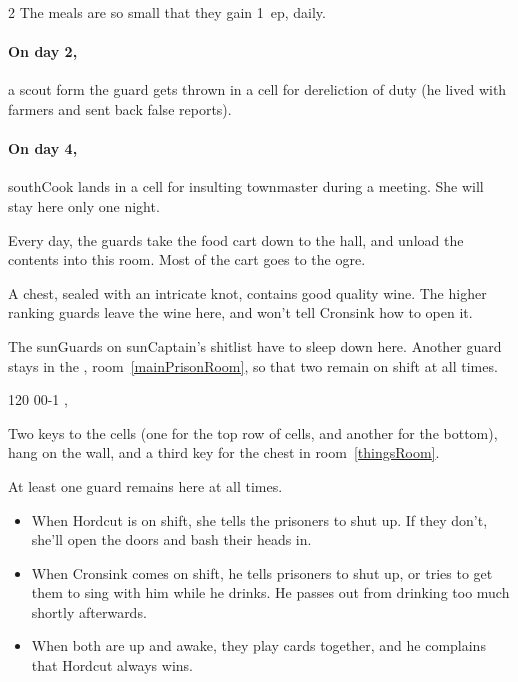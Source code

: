 \begin{multicols}{2}
The meals are so small that they gain 1~\gls{ep}, daily.

\paragraph{On day 2,}
a scout form the \gls{guard} gets thrown in a cell for dereliction of duty (he lived with farmers and sent back false reports).

\paragraph{On day 4,}
\gls{southCook} lands in a cell for insulting \gls{townmaster} during a meeting.
She will stay here only one night.


Every day, the guards take the food cart down to the hall, and unload the contents into this room.
Most of the cart goes to the \gls{ogre}.%

A chest, sealed with an intricate knot, contains good quality wine.
The higher ranking guards leave the wine here, and won't tell Cronsink how to open it.


The \glspl{sunGuard} on \gls{sunCaptain}'s shitlist have to sleep down here.
Another guard stays in the , room~\vref{mainPrisonRoom}, so that two remain on shift at all times.

%
  {{1}{2}{0}}%
  {{0}{0}{-1}}%
  {%
    \shortsword
    \partialplate
  }%
  {\brawler, \berserker}%
  {\lootSmall}%
  {}%

Two keys to the cells (one for the top row of cells, and another for the bottom), hang on the wall, and a third key for the chest in room~\vref{thingsRoom}.


At least one guard remains here at all times.
\begin{itemize}
  \item
  When Hordcut is on shift, she tells the prisoners to shut up.
  If they don't, she'll open the doors and bash their heads in.
  \item
  When Cronsink comes on shift, he tells prisoners to shut up, or tries to get them to sing with him while he drinks.
  He passes out from drinking too much shortly afterwards.
  \item
  When both are up and awake, they play cards together, and he complains that Hordcut always wins.
\end{itemize}


\end{multicols}
